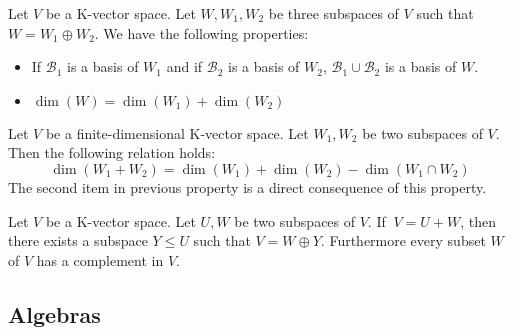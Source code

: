 	\begin{theorem}\label{linalgebra:theorem:direct_sum}
	        Let $V$ be a K-vector space. Let $W, W_1, W_2$ be three subspaces of $V$ such that $W=W_1\oplus W_2$. We have the following properties:
	        \begin{itemize}
			\item If $\mathcal{B}_1$ is a basis of $W_1$ and if $\mathcal{B}_2$ is a basis of $W_2$, $\mathcal{B}_1\cup\mathcal{B}_2$ is a basis of $W$.
        	        \item $\dim(W) = \dim(W_1) + \dim(W_2)$
		\end{itemize}
	\end{theorem}
        \begin{theorem}\label{linalgebra:theorem:sum}
	        Let $V$ be a finite-dimensional K-vector space. Let $W_1, W_2$ be two subspaces of $V$. Then the following relation holds:
	        \begin{equation}
			\dim(W_1 + W_2) = \dim(W_1) + \dim(W_2) - \dim(W_1\cap W_2)
		\end{equation}
        	The second item in previous property is a direct consequence of this property.
	\end{theorem}

        \begin{theorem}\label{linalgebra:theorem:complement}
	        Let $V$ be a K-vector space. Let $U,W$ be two subspaces of $V$. If $\ V = U+W$, then there exists a subspace $Y\leq U$ such that $V = W\oplus Y$. Furthermore every subset $W$ of $V$ has a complement in $V$.
	\end{theorem}

    
\subsection{Algebras}

